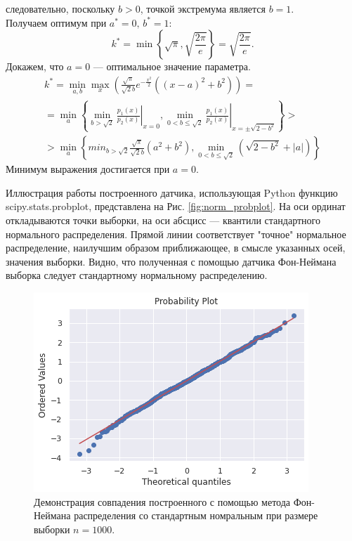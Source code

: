 следовательно, поскольку $b > 0$, точкой экстремума является $b = 1$.\\
Получаем оптимум при $a^* = 0,\, b^* = 1:$
$$
    k^* = \min\left\{\sqrt{\pi}, \sqrt{\frac{2\pi}{e}}\right\} = 
     \sqrt{\frac{2\pi}{e}}.
$$
Докажем, что $a = 0$ --- оптимальное значение параметра.
\begin{multline}
    k^* = \min_{a, b} \max_x \left( \frac{\sqrt{\pi}}{\sqrt{2}b} e^{-\frac{x^2}{2}}
     \left((x - a)^2 + b^2\right)\right) = \\
    = \min_a\left\{\min_{b > \sqrt{2}}\left.\frac{p_1(x)}{p_2(x)}\right|_{x = 0},
     \left.\min_{0 < b\leq\sqrt{2}}\frac{p_1(x)}{p_2(x)}\right|_{x =
     \pm\sqrt{2 - b^2}}\right\} > \\
    > \min_a\left\{min_{b > \sqrt{2}}\frac{\sqrt{\pi}}{\sqrt{2}b}
     \left(a^2 + b^2\right), \min_{0 < b \leq \sqrt{2}} \left( \sqrt{2 - b^2} +
     |a|\right)\right\}
\end{multline}
Минимум выражения достигается при $a = 0$.

Иллюстрация работы построенного датчика, использующая Python функцию
 scipy.stats.probplot, представлена на Рис. \eqref{fig:norm_probplot}. На оси ординат
 откладываются точки выборки, на оси абсцисс --- квантили стандартного нормального
 распределения. Прямой линии соответствует "точное"  нормальное распределение,
 наилучшим образом приближающее, в смысле указанных осей, значения выборки. Видно, 
 что полученная с помощью датчика Фон-Неймана выборка следует стандартному нормальному
 распределению.

\begin{figure}[ht]
	\centering
	\includegraphics[width = 0.8\linewidth]{"./resources/norm_probplot.png"}
	\caption{Демонстрация совпадения построенного с помощью метода Фон-Неймана
     распределения со стандартным номральным при размере выборки $ n = 1000 $.}
    \label{fig:norm_probplot}
\end{figure}

